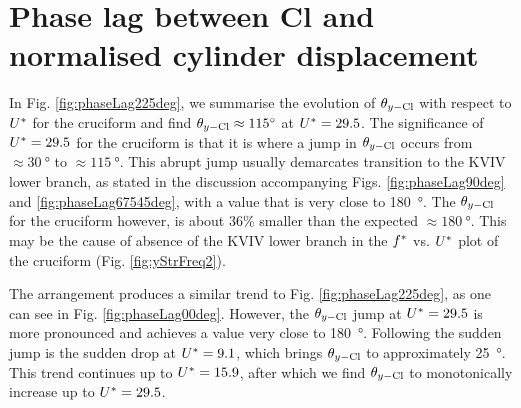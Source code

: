 \documentclass[oneside]{utmthesis}
\begin{document}
\section{Phase lag between Cl and normalised cylinder displacement} \label{sec:phaseLag22500}
In Fig. \ref{fig:phaseLag225deg}, we summarise the evolution of $\theta_{y-\text{Cl}}$ with respect to $U^{*}$ for the \angtw{} cruciform and find $\plag \approx \SI{115}{\degree}$ at $U^{*} = 29.5$. The significance of $U^{*} = 29.5$ for the \angtw{} cruciform is that it is where a jump in $\theta_{y-\text{Cl}}$ occurs from $\approx \SI{30}{\degree}$ to $\approx \SI{115}{\degree}$. This abrupt jump usually demarcates transition to the KVIV lower branch, as stated in the discussion accompanying Figs. \ref{fig:phaseLag90deg} and \ref{fig:phaseLag67545deg}, with a value that is very close to \SI{180}{\degree}. The $\theta_{y-\text{Cl}}$ for the \angtw{} cruciform however, is about 36\% smaller than the expected $\approx \SI{180}{\degree}$. This may be the cause of absence of the KVIV lower branch in the $f^{*}$ vs. $U^{*}$ plot of the \angtw{} cruciform (Fig. \ref{fig:yStrFreq2}).

The \angon{} arrangement produces a similar trend to Fig. \ref{fig:phaseLag225deg}, as one can see in Fig. \ref{fig:phaseLag00deg}. However, the $\theta_{y-\text{Cl}}$ jump at  $U^{*} =29.5$ is more pronounced and achieves a value very close to \SI{180}{\degree}. Following the sudden jump is the sudden drop at $U^{*} = 9.1$, which brings $\theta_{y-\text{Cl}}$ to approximately \SI{25}{\degree}. This trend continues up to $U^{*} = 15.9$, after which we find $\theta_{y-\text{Cl}}$ to monotonically increase up to $U^{*} = 29.5$.
\end{document}
